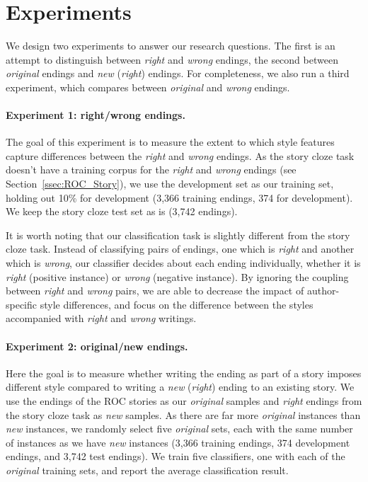 \documentclass[11pt,a4paper]{article}
\newcommand{\secref}[1]{Section~\ref{ssec:#1}}
\newcommand{\isectionb}[1]{\section{#1}\label{ssec:#1}}
\begin{document}
\isectionb{Experiments}
We design two experiments to answer our research questions. 
The first is an attempt to distinguish between {\it right} and {\it wrong} endings,
the second  between {\it original} endings and {\it new} ({\it right}) endings.
For completeness, we also run a third experiment, which compares between {\it original} and {\it wrong} endings. 


\paragraph{Experiment 1: right/wrong endings.}
The goal of this experiment is to measure the extent to which  style features capture differences between the {\it right} and {\it wrong} endings.
As the story cloze task doesn't have a training corpus for the {\it
  right} and {\it wrong} endings (see \secref{ROC_Story}), we use the
development set as our training set, holding out 10\% for development
(3,366 training endings, 374 for development). 
 We keep the story cloze test set as is (3,742 endings).

It is worth noting that our classification task is slightly different from the story cloze task. 
Instead of classifying pairs of endings, one which is {\it right} and
another which is {\it wrong}, our classifier decides about each ending
individually, whether it is \emph{right} (positive instance) or
\emph{wrong} (negative instance).
By ignoring the coupling between {\it right} and {\it wrong} pairs, 
we are able to decrease the impact of author-specific style differences,
and focus on the difference between the styles accompanied with {\it right} and {\it wrong} writings.

\paragraph{Experiment 2: original/new endings.}

Here the goal is to measure whether writing the ending as part of a
story imposes different style compared to writing a {\it new} ({\it right}) ending to an existing story.
We use the endings of the ROC stories as our {\it original} samples and {\it right} endings from the story cloze task  as {\it new} samples.
As there are far more {\it original} instances than {\it new}
instances, we randomly select five  {\it original} sets, each with the same number of
instances as we have
\emph{new} instances (3,366 training endings, 374 development endings, and 3,742 test endings).
We train five classifiers, one with each of the {\it original} training sets, and report the average classification result.
\end{document}
